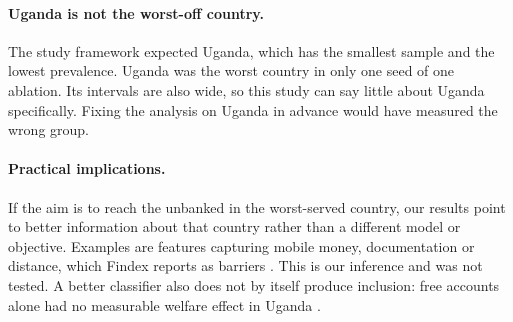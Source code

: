 \documentclass[11pt]{article}
\begin{document}
\paragraph{Uganda is not the worst-off country.} The study framework expected Uganda, which has the smallest sample and the lowest prevalence. Uganda was the worst country in only one seed of one ablation. Its intervals are also wide, so this study can say little about Uganda specifically. Fixing the analysis on Uganda in advance would have measured the wrong group.

\paragraph{Practical implications.} If the aim is to reach the unbanked in the worst-served country, our results point to better information about that country rather than a different model or objective. Examples are features capturing mobile money, documentation or distance, which Findex reports as barriers \citep[pp.~53--54]{demirguckunt2022findex}. This is our inference and was not tested. A better classifier also does not by itself produce inclusion: free accounts alone had no measurable welfare effect in Uganda \citep[p.~28]{demirguckunt2022findex}.
\end{document}

